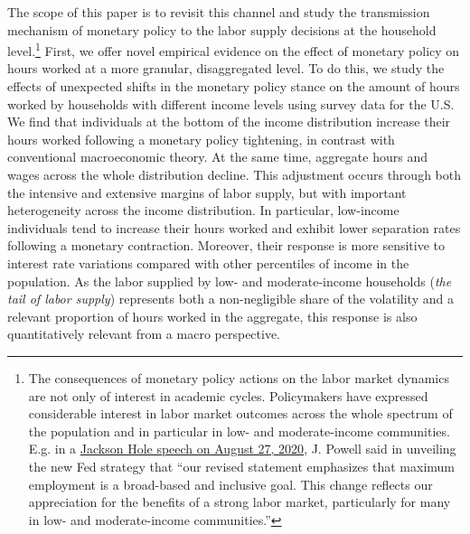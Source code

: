 \documentclass[a4paper,12pt]{article}%
\begin{document}
The scope of this paper is to revisit this channel and study the transmission mechanism of monetary policy to the labor supply decisions at the household level.\footnote{The consequences of monetary policy actions on the labor market dynamics are not only of interest in academic cycles. Policymakers have expressed considerable interest in labor market outcomes across the whole spectrum of the population and in particular in low- and moderate-income communities. E.g. in a \href{https://www.federalreserve.gov/newsevents/speech/powell20200827a.htm}{Jackson Hole speech on August 27, 2020},  J. Powell said in unveiling the new Fed strategy that ``our revised statement emphasizes that maximum employment is a broad-based and inclusive goal. This change reflects our appreciation for the benefits of a strong labor market, particularly for many in low- and moderate-income communities.''}
First, we offer novel empirical evidence on the effect of monetary policy on hours worked at a more granular, disaggregated level. To do this, we study the effects of unexpected shifts in the monetary policy stance on the amount of hours worked by households with different income levels using survey data for the U.S. We find that individuals at the bottom of the income distribution increase their hours worked following a monetary policy tightening, in contrast with conventional macroeconomic theory. At the same time, aggregate hours and wages across the whole distribution decline. This adjustment occurs through both the intensive and extensive margins of labor supply, but with important heterogeneity across the income distribution. In particular, low-income individuals tend to increase their hours worked and exhibit lower separation rates following a monetary contraction.   
Moreover, their response is more sensitive to interest rate variations compared with other percentiles of income in the population. As the labor supplied by low- and moderate-income households (\emph{the tail of labor supply}) represents both a non-negligible share of the volatility and a relevant proportion of hours worked in the aggregate, this response is also quantitatively relevant from a macro perspective.
\end{document}
